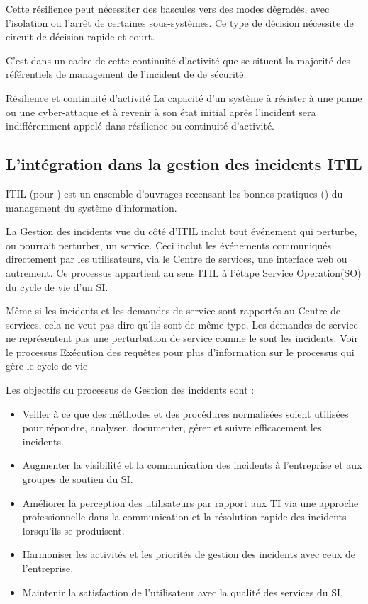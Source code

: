  Cette résilience peut  nécessiter des bascules vers des modes dégradés, avec l'isolation ou l'arrêt de certaines sous-systèmes. Ce type de décision nécessite de circuit de décision rapide et court.

C'est dans un cadre de cette continuité d'activité que se situent la majorité des référentiels de management de l'incident de de sécurité.

\begin{notebox}{Résilience et continuité d'activité}
La capacité d’un système  à résister à une panne ou une cyber-attaque et à revenir à son état initial après l’incident sera indifféremment appelé dans \ecours résilience ou continuité d'activité. 
\end{notebox}


\subsection{L'intégration dans la gestion des incidents ITIL}

ITIL (pour ) est un ensemble d'ouvrages recensant les bonnes pratiques () du management du système d'information. 

La Gestion des incidents vue du côté d'ITIL  inclut tout événement qui perturbe, ou pourrait perturber, un service. Ceci inclut les événements communiqués directement par les utilisateurs, via le Centre de services, une interface web ou autrement.
Ce processus appartient au sens ITIL à l'étape Service Operation(SO) du cycle de vie d'un SI.

Même si les incidents et les demandes de service sont rapportés au Centre de services, cela ne veut pas dire qu'ils sont de même type. Les demandes de service ne représentent pas une perturbation de service comme le sont les incidents. Voir le processus Exécution des requêtes pour plus d'information sur le processus qui gère le cycle de vie 

Les objectifs du processus de Gestion des incidents sont :

\begin{itemize}
  \item Veiller à ce que des méthodes et des procédures normalisées soient utilisées pour répondre, analyser, documenter, gérer et suivre efficacement les incidents.
  \item  Augmenter la visibilité et la communication des incidents à l'entreprise et aux groupes de soutien du SI.
  \item  Améliorer la perception des utilisateurs par rapport aux TI via une approche professionnelle dans la communication et la résolution rapide des incidents lorsqu'ils se produisent.
  \item Harmoniser les activités et les priorités de gestion des incidents avec ceux de l'entreprise.
  \item Maintenir la satisfaction de l'utilisateur avec la qualité des services du SI.
\end{itemize}

